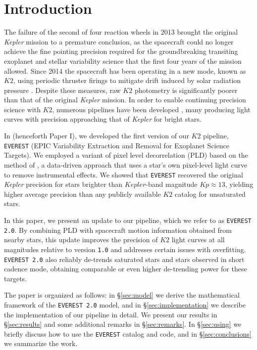 \documentclass[]{emulateapj}
\newcommand{\Kp}{\ensuremath{Kp}}
\newcommand{\edited}[1]{{\color{red} #1}}
\begin{document}
\section{Introduction}
\label{sec:intro}
The failure of the second of four reaction wheels in 2013 brought the original
\emph{Kepler} mission to a premature conclusion, as the spacecraft could no longer
achieve the fine pointing precision required for the groundbreaking
transiting exoplanet and stellar variability science that the first four years of the
mission allowed. Since 2014 the spacecraft has been operating in a new mode, known
as $K2$, \edited{using periodic thruster firings to mitigate drift induced by solar radiation pressure}
\citep{Howell14}. Despite these measures, raw $K2$ photometry is significantly
poorer than that of the original \emph{Kepler} mission. In order to enable
continuing precision science with $K2$, numerous pipelines have been developed
\citep[e.g.,][]{VanderburgJohnson14,Armstrong15,Lund15,Crossfield15,
ForemanMackey15,Huang15,Aigrain16,Libralato2016a,Libralato2016b},
many producing light curves with precision approaching that of \emph{Kepler} for
bright stars.

In \cite{Luger16} (henceforth Paper I), we developed the first version of our
$K2$ pipeline, \texttt{EVEREST} (EPIC Variability Extraction and Removal for Exoplanet
Science Targets).
We employed a variant of pixel level decorrelation (PLD) based on the method of \cite{Deming15},
a data-driven approach that uses a star's own pixel-level light curve to remove
instrumental effects. We showed that \texttt{EVEREST} recovered the original \emph{Kepler}
precision for stars brighter than $Kepler$-band magnitude $\Kp \approx 13$, yielding higher
average precision than any publicly available $K2$ catalog for unsaturated stars.

In this paper, we present an update to our pipeline, which we refer to as \texttt{EVEREST 2.0}.
By combining PLD with spacecraft motion information obtained from nearby stars,
this update improves the precision of $K2$ light curves at all magnitudes relative to version \texttt{1.0} and addresses
certain issues with overfitting. \texttt{EVEREST 2.0} also reliably de-trends saturated
stars and stars observed in short cadence mode, obtaining comparable or even higher de-trending
power for these targets.

The paper is organized as follows: in \S\ref{sec:model} we derive the mathematical
framework of the \texttt{EVEREST 2.0} model, and in \S\ref{sec:implementation} we describe
the implementation of our pipeline in detail. We present our results in \S\ref{sec:results}
and some additional remarks in \S\ref{sec:remarks}. In \S\ref{sec:using} we briefly discuss how
to use the \texttt{EVEREST} catalog and code, and in \S\ref{sec:conclusions} we
summarize the work.
\end{document}
